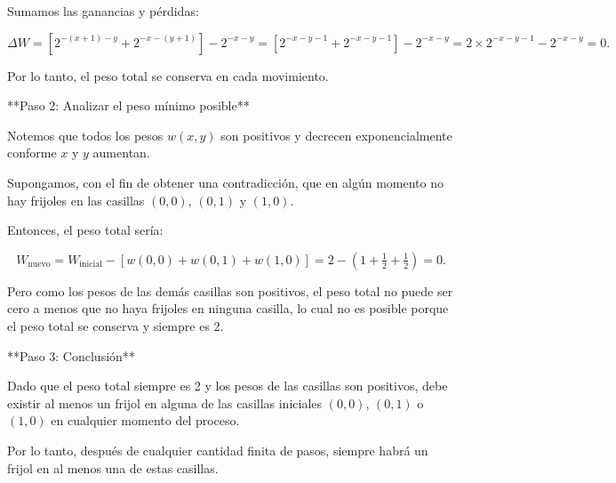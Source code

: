 \documentclass[11pt]{scrartcl}
\begin{document}
\begin{problem}
\begin{hint}
\begin{solu}
Sumamos las ganancias y pérdidas:

$$
\Delta W = [2^{-(x+1) - y} + 2^{-x - (y+1)}] - 2^{-x - y} = [2^{-x - y - 1} + 2^{-x - y - 1}] - 2^{-x - y} = 2 \times 2^{-x - y - 1} - 2^{-x - y} = 0.
$$

Por lo tanto, el peso total se conserva en cada movimiento.

**Paso 2: Analizar el peso mínimo posible**

Notemos que todos los pesos $w(x, y)$ son positivos y decrecen exponencialmente conforme $x$ y $y$ aumentan.

Supongamos, con el fin de obtener una contradicción, que en algún momento no hay frijoles en las casillas $(0, 0)$, $(0, 1)$ y $(1, 0)$.

Entonces, el peso total sería:

$$
W_{\text{nuevo}} = W_{\text{inicial}} - [w(0,0) + w(0,1) + w(1,0)] = 2 - \left(1 + \tfrac{1}{2} + \tfrac{1}{2}\right) = 0.
$$

Pero como los pesos de las demás casillas son positivos, el peso total no puede ser cero a menos que no haya frijoles en ninguna casilla, lo cual no es posible porque el peso total se conserva y siempre es 2.

**Paso 3: Conclusión**

Dado que el peso total siempre es 2 y los pesos de las casillas son positivos, debe existir al menos un frijol en alguna de las casillas iniciales $(0, 0)$, $(0, 1)$ o $(1, 0)$ en cualquier momento del proceso.

Por lo tanto, después de cualquier cantidad finita de pasos, siempre habrá un frijol en al menos una de estas casillas.

\end{solu}
\end{hint}
\end{problem}
\end{document}
